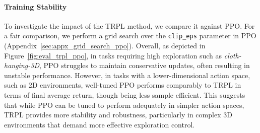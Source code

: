 \paragraph{Training Stability}

To investigate the impact of the TRPL method, we compare it against PPO. For a fair comparison, we perform a grid search over the \texttt{clip\_eps} parameter in PPO (Appendix~\ref{sec:appx_grid_search_ppo}). Overall, as depicted in Figure~\ref{fig:eval_trpl_ppo}, in tasks requiring high exploration such as \emph{cloth-hanging-3D}, PPO struggles to maintain conservative updates, often resulting in unstable performance. However, in tasks with a lower-dimensional action space, such as 2D environments, well-tuned PPO performs comparably to TRPL in terms of final average return, though being less sample efficient. This suggests that while PPO can be tuned to perform adequately in simpler action spaces, TRPL provides more stability and robustness, particularly in complex 3D environments that demand more effective exploration control.

